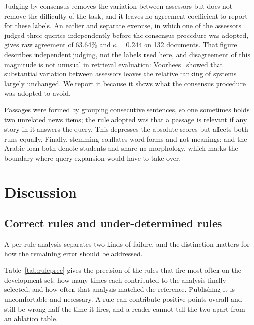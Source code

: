 \documentclass[conference]{IEEEtran}
\newcommand{\ps}[1]{{\pashtofont\textpashto{#1}}}
\begin{document}
Judging by consensus removes the variation between assessors but does not
remove the difficulty of the task, and it leaves no agreement coefficient to
report for these labels. An earlier and separate exercise, in which one of the
assessors judged three queries independently before the consensus procedure was
adopted, gives raw agreement of 63.64\% and $\kappa = 0.244$ on 132 documents.
That figure describes independent judging, not the labels used here, and
disagreement of this magnitude is not unusual in retrieval evaluation:
Voorhees~\cite{voorhees2000} showed that substantial variation between
assessors leaves the relative ranking of systems largely unchanged. We report it
because it shows what the consensus procedure was adopted to avoid.

Passages were formed by grouping consecutive sentences, so one sometimes holds
two unrelated news items; the rule adopted was that a passage is relevant if any
story in it answers the query. This depresses the absolute scores but affects
both runs equally. Finally, stemming conflates word forms and not meanings:
\ps{زده کوونکي} and the Arabic loan \ps{محصلین} both denote students and share
no morphology, which marks the boundary where query expansion would have to take
over.

\section{Discussion}

\subsection{Correct rules and under-determined rules}

A per-rule analysis separates two kinds of failure, and the distinction matters
for how the remaining error should be addressed.

Table~\ref{tab:ruleprec} gives the precision of the rules that fire most often
on the development set: how many times each contributed to the analysis finally
selected, and how often that analysis matched the reference. Publishing it is
uncomfortable and necessary. A rule can contribute positive points overall and
still be wrong half the time it fires, and a reader cannot tell the two apart
from an ablation table.
\end{document}
